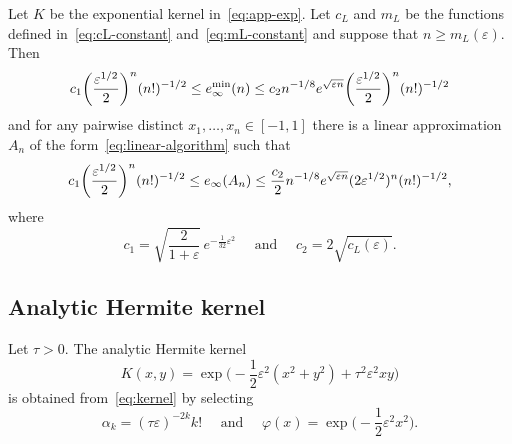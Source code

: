 \documentclass{mcom-l}
\numberwithin{equation}{section}
\numberwithin{theorem}{section} %
\begin{document}
\begin{corollary}
  Let $K$ be the exponential kernel in~\eqref{eq:app-exp}.
  Let $c_L$ and $m_L$ be the functions defined in~\eqref{eq:cL-constant} and~\eqref{eq:mL-constant} and suppose that $n \geq m_L(\varepsilon)$.
  Then
  \begin{equation*}
    c_1 \bigg( \frac{\varepsilon^{1/2}}{2} \bigg)^{n} (n!)^{-1/2} \leq e_\infty^{\min}(n) \leq  c_2 n^{-1/8} e^{\sqrt{\smash[b]{\varepsilon n}}} \bigg( \frac{\varepsilon^{1/2}}{2} \bigg)^{n} (n!)^{-1/2}
  \end{equation*}
  and for any pairwise distinct $x_1, \ldots, x_n \in [-1, 1]$ there is a linear approximation $A_n$ of the form~\eqref{eq:linear-algorithm} such that
  \begin{equation*}
    c_1 \bigg( \frac{\varepsilon^{1/2}}{2} \bigg)^{n} (n!)^{-1/2} \leq e_\infty(A_n) \leq  \frac{c_2}{2} n^{-1/8} e^{\sqrt{\smash[b]{\varepsilon n}}} (2\varepsilon^{1/2})^{n} (n!)^{-1/2},
  \end{equation*}
  where
  \begin{equation*}
    c_1 = \sqrt{ \frac{2}{1 + \varepsilon}} \, e^{-\frac{1}{32} \varepsilon^2} \quad \text{ and } \quad c_2 = 2 \sqrt{c_L(\varepsilon)}.
  \end{equation*}
\end{corollary}

\subsection{Analytic Hermite kernel}

Let $\tau > 0$.
The analytic Hermite kernel
\begin{equation} \label{eq:app-hermite}
  K(x, y) = \exp\bigg( \! - \frac{1}{2} \varepsilon^2(x^2 + y^2)  + \tau^2 \varepsilon^2 xy \bigg)
\end{equation}
is obtained from~\eqref{eq:kernel} by selecting
\begin{equation*}
  \alpha_k = (\tau \varepsilon)^{-2k} k! \quad \text{ and } \quad \varphi(x) = \exp\bigg(\!-\frac{1}{2} \varepsilon^2 x^2 \bigg).
\end{equation*}
\end{document}
